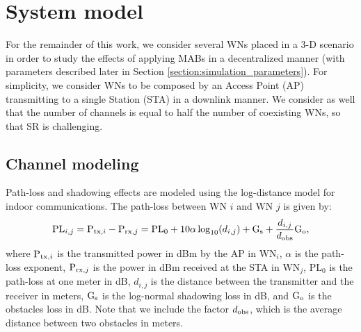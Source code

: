 \documentclass[10pt,journal,compsoc]{IEEEtran}
\begin{document}
	\section{System model}
	\label{section:system_model}	
	
	For the remainder of this work, we consider several WNs placed in a 3-D scenario in order to study the effects of applying MABs in a decentralized manner (with parameters described later in Section \ref{section:simulation_parameters}). For simplicity, we consider WNs to be composed by an Access Point (AP) transmitting to a single Station (STA) in a downlink manner. We consider as well that the number of channels is equal to half the number of coexisting WNs, so that SR is challenging. 
	
	\subsection{Channel modeling}
	\label{section:channel_modelling}		
	Path-loss and shadowing effects are modeled using the log-distance model for indoor communications. The path-loss between WN $i$ and WN $j$ is given by:	
	\begin{equation}
	\text{PL}_{i,j} = \text{P}_{{\rm tx},i} - \text{P}_{{\rm rx},j} = \text{PL}_0 + 10  \alpha  \log_{10}(d_{i,j}) + \text{G}_{{\rm s}} + \frac{d_{i,j}}{d_{{\rm obs}}} \text{G}_{{\rm o}}, \nonumber
	\nonumber
	\end{equation}
	where $\text{P}_{{\rm tx},i}$ is the transmitted power in dBm by the AP in $\text{WN}_i$, $\alpha$ is the path-loss exponent, $\text{P}_{{\rm rx},j}$ is the power in dBm received at the STA in $\text{WN}_j$, $\text{PL}_0$ is the path-loss at one meter in dB, $d_{i,j}$ is the distance between the transmitter and the receiver in meters, $\text{G}_{{\rm s}}$ is the log-normal shadowing loss in dB, and $\text{G}_{{\rm o}}$ is the obstacles loss in dB. Note that we include the factor $d_{{\rm obs}}$, which is the average distance between two obstacles in meters. 
	
\end{document}
